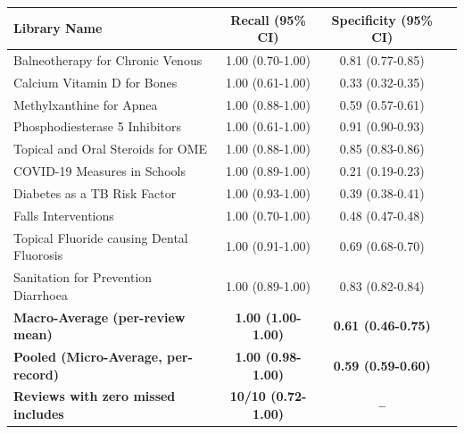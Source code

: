 \begin{tabularx}{\textwidth}{@{} X c c c @{}}
\toprule
\textbf{Library Name} & \textbf{Recall (95\% CI)} & \textbf{Specificity (95\% CI)} \\
\midrule
Balneotherapy for Chronic Venous & 1.00 (0.70-1.00) & 0.81 (0.77-0.85) \\
Calcium Vitamin D for Bones & 1.00 (0.61-1.00) & 0.33 (0.32-0.35) \\
Methylxanthine for Apnea & 1.00 (0.88-1.00) & 0.59 (0.57-0.61) \\
Phosphodiesterase 5 Inhibitors & 1.00 (0.61-1.00) & 0.91 (0.90-0.93) \\
Topical and Oral Steroids for OME & 1.00 (0.88-1.00) & 0.85 (0.83-0.86) \\
COVID-19 Measures in Schools & 1.00 (0.89-1.00) & 0.21 (0.19-0.23) \\
Diabetes as a TB Risk Factor & 1.00 (0.93-1.00) & 0.39 (0.38-0.41) \\
Falls Interventions & 1.00 (0.70-1.00) & 0.48 (0.47-0.48) \\
Topical Fluoride causing Dental Fluorosis & 1.00 (0.91-1.00) & 0.69 (0.68-0.70) \\
Sanitation for Prevention Diarrhoea & 1.00 (0.89-1.00) & 0.83 (0.82-0.84) \\
\midrule
\textbf{Macro-Average (per-review mean)} & \textbf{1.00 (1.00-1.00)} & \textbf{0.61 (0.46-0.75)} \\
\textbf{Pooled (Micro-Average, per-record)} & \textbf{1.00 (0.98-1.00)} & \textbf{0.59 (0.59-0.60)} \\
\textbf{Reviews with zero missed includes} & \textbf{10/10 (0.72-1.00)} & \textbf{--} \\
\bottomrule
\end{tabularx}